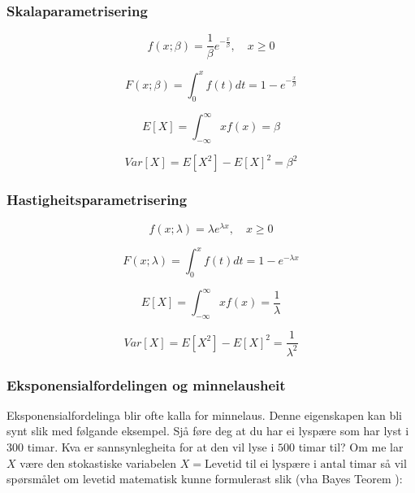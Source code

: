 \subsubsection{Skalaparametrisering}\label{eksp:skala}
\begin{equation}
    f(x; \beta) = \frac{1}{\beta} e^{-\frac{x}{\beta}},  \quad  x \geq 0
\end{equation}

\begin{equation}
    F(x; \beta) = \int_{0}^x f(t) dt = 1 - e^{-\frac{x}{\beta}}
\end{equation}

\begin{equation}
    E[X] = \int_{-\infty}^{\infty} xf(x) = \beta
\end{equation}

\begin{equation}
    Var[X] = E[X^2] - E[X]^2 = \beta^2
\end{equation}

\subsubsection{Hastigheitsparametrisering}

\begin{equation}
    f(x; \lambda) = \lambda e^{\lambda x},  \quad  x \geq 0
\end{equation}

\begin{equation}
    F(x; \lambda) = \int_{0}^x f(t) dt = 1 - e^{- \lambda x}
\end{equation}

\begin{equation}
    E[X] = \int_{-\infty}^{\infty} xf(x) = \frac{1}{\lambda}
\end{equation}

\begin{equation}
    Var[X] = E[X^2] - E[X]^2 = \frac{1}{\lambda^2}
\end{equation}

\subsubsection{Eksponensialfordelingen og minnelausheit} \label{memless}
Eksponensialfordelinga blir ofte kalla for minnelaus. \cite{wiki:memless} Denne eigenskapen kan bli synt slik med følgande eksempel. Sjå føre deg at du har ei lyspære som har lyst i $300$ timar. Kva er sannsynlegheita for at den vil lyse i $500$ timar til? Om me lar $X$ være den stokastiske variabelen $X = \text{Levetid til ei lyspære i antal timar}$ så vil spørsmålet om levetid matematisk kunne formulerast slik (vha Bayes Teorem \cite{wiki:bayes}):

